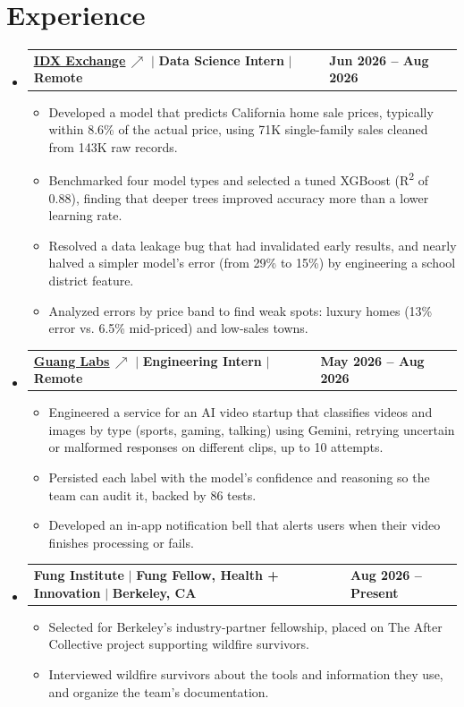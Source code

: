 \documentclass[letterpaper,11pt]{article}
\makeatletter
\newcommand{\resumeItem}[1]{%
  \item\small{{#1\vspace{-2pt}}}%
}
\newcommand{\resumeCompactHeading}[4]{
  \vspace{-1pt}\item
    \begin{tabularx}{1.0\textwidth}[t]{@{}X@{}>{\raggedright\arraybackslash}p{1.5in}@{}}
      \textbf{#1} $|$ \textbf{#2} $|$ \textbf{\small #3} & \textbf{\small #4} \\
    \end{tabularx}\vspace{-3pt}
}
\newcommand{\lk}{\,{\scriptsize$\nearrow$}}
\newcommand{\resumeSubHeadingListStart}{\begin{itemize}[leftmargin=0.0in, label={}]}
\newcommand{\resumeSubHeadingListEnd}{\end{itemize}}
\newcommand{\resumeItemListStart}{\begin{itemize}[itemsep=2.5pt, topsep=3pt]}
\newcommand{\resumeItemListEnd}{\end{itemize}\vspace{-4pt}}
\makeatother
\begin{document}
\section{Experience}
  \resumeSubHeadingListStart

    \resumeCompactHeading
        {\href{https://idxexchange.com/}{\uline{IDX Exchange}}\lk}{Data Science Intern}{Remote}{Jun 2026 -- Aug 2026}
        \resumeItemListStart
            \resumeItem{Developed a model that predicts California home sale prices, typically within 8.6\% of the actual price, using 71K single-family sales cleaned from 143K raw records.}
            \resumeItem{Benchmarked four model types and selected a tuned XGBoost (R\textsuperscript{2} of 0.88), finding that deeper trees improved accuracy more than a lower learning rate.}
            \resumeItem{Resolved a data leakage bug that had invalidated early results, and nearly halved a simpler model's error (from 29\% to 15\%) by engineering a school district feature.}
            \resumeItem{Analyzed errors by price band to find weak spots: luxury homes (13\% error vs. 6.5\% mid-priced) and low-sales towns.}
        \resumeItemListEnd

    \resumeCompactHeading
        {\href{https://guanglabs.com/}{\uline{Guang Labs}}\lk}{Engineering Intern}{Remote}{May 2026 -- Aug 2026}
        \resumeItemListStart
             \resumeItem{Engineered a service for an AI video startup that classifies videos and images by type (sports, gaming, talking) using Gemini, retrying uncertain or malformed responses on different clips, up to 10 attempts.}
             \resumeItem{Persisted each label with the model's confidence and reasoning so the team can audit it, backed by 86 tests.}
             \resumeItem{Developed an in-app notification bell that alerts users when their video finishes processing or fails.}
        \resumeItemListEnd

    \resumeCompactHeading
        {Fung Institute}{Fung Fellow, Health + Innovation}{Berkeley, CA}{Aug 2026 -- Present}
        \resumeItemListStart
            \resumeItem{Selected for Berkeley's industry-partner fellowship, placed on The After Collective project supporting wildfire survivors.}
            \resumeItem{Interviewed wildfire survivors about the tools and information they use, and organize the team's documentation.}
        \resumeItemListEnd

  \resumeSubHeadingListEnd
\vspace{-12pt}
\end{document}
